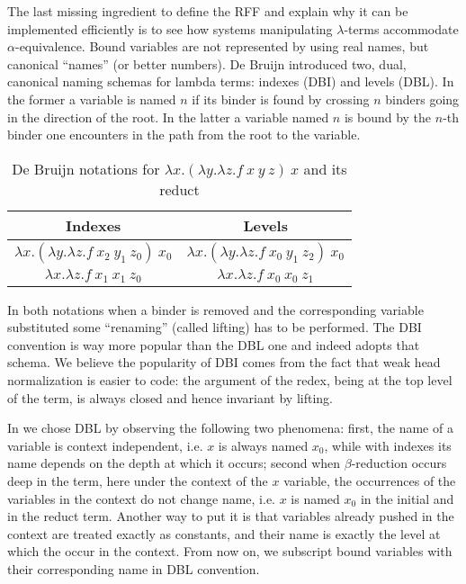 \documentclass{llncs}
\begin{document}
The last missing ingredient to define the RFF and explain why it can be
implemented efficiently is to see how systems manipulating $\lambda$-terms
accommodate
$\alpha$-equivalence.  Bound variables are not represented by using
real names, but canonical ``names'' (or better numbers).  De Bruijn introduced
two, dual, canonical naming schemas for lambda terms: indexes (DBI) and levels
(DBL).  In the former a variable is named $n$ if its binder is found by
crossing $n$ binders going in the direction of the root.  In the latter a
variable named $n$ is bound by the $n$-th binder one encounters in the path
from the root to the variable.

\begin{table}
\begin{center}
\begin{tabular}{c@{~~}|@{~~}c}
	Indexes & Levels\\\hline
$\lambda x.(\lambda y.\lambda z.f~x_2~y_1~z_0)~x_0$ &
$\lambda x.(\lambda y.\lambda z.f~x_0~y_1~z_2)~x_0$ \\
$\lambda x.\lambda z.f~x_1~x_1~z_0$ &
$\lambda x.\lambda z.f~x_0~x_0~z_1$ \\
\end{tabular}
\end{center}
\caption{\label{example2}
De Bruijn notations for
$\lambda x.(\lambda y.\lambda z.f~x~y~z)~x$
and its reduct}
\end{table}

In both notations when a binder is removed and the corresponding variable
substituted some ``renaming'' (called lifting) has to be performed.  
The DBI convention is way more popular than the DBL one and \tedius{}
indeed adopts that schema.  We believe the popularity of DBI comes from the
fact that weak head normalization is easier to code: the argument of the
redex, being at the top level of the term, is always closed and hence
invariant by lifting.

In \elpi{} we chose DBL by observing the following two phenomena:
first, the name of a variable is context independent, i.e. $x$ is
always named $x_0$, while with indexes its name depends on the depth at
which it occurs; second
when $\beta$-reduction occurs deep in the term, here under the context
of the $x$ variable, the occurrences of the variables in the context do
not change name, i.e. $x$ is named $x_0$ in the initial and in the reduct
term.  Another way to put it is that variables already pushed in the context
are treated exactly as constants, and their name is exactly the level at
which the occur in the context.  From now on, we subscript bound variables
with their corresponding name in DBL convention.
\end{document}
